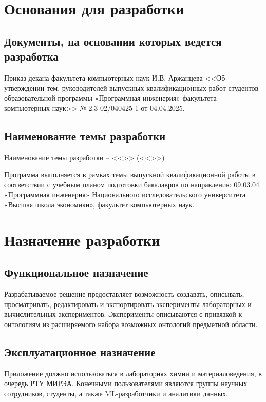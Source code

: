 \documentclass[a4paper,12pt,reqno]{article}
\begin{document}
    \section{Основания для разработки}

    \subsection{Документы, на основании которых ведется разработка}
    Приказ декана факультета компьютерных наук И.В. Аржанцева <<Об утверждении тем, руководителей выпускных квалификационных работ студентов образовательной программы «Программная инженерия» факультета компьютерных наук>> № 2.3-02/040425-1 от 04.04.2025.

    \subsection{Наименование темы разработки}
    Наименование темы разработки – <<\unskip>> (<<\unskip>>)

    Программа выполняется в рамках темы выпускной квалификационной работы в соответствии с учебным планом подготовки бакалавров по направлению 09.03.04 «Программная инженерия» Национального исследовательского университета «Высшая школа экономики», факультет компьютерных наук.
    \newpage


    \section{Назначение разработки}

    \subsection{Функциональное назначение}
    Разрабатываемое решение предоставляет возможность создавать, описывать, просматривать, редактировать и экспортировать эксперименты лабораторных и вычислительных экспериментов. Эксперименты описываются с привязкой к онтологиям из расширяемого набора возможных онтологий предметной области.

    \subsection{Эксплуатационное назначение}
    Приложение должно использоваться в лабораториях химии и материаловедения, в очередь РТУ МИРЭА. Конечными пользователями являются группы научных сотрудников, студенты, а также ML-разработчики и аналитики данных.
    \newpage
\end{document}
